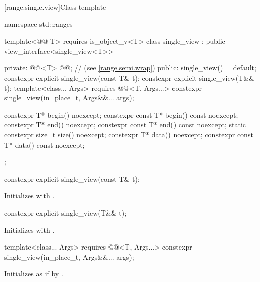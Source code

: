 [range.single.view]{Class template }

%
\begin{codeblock}
namespace std::ranges {
  template<@@ T>
    requires is_object_v<T>
  class single_view : public view_interface<single_view<T>> {
  private:
    @@<T> @@;      // \expos{} (see \ref{range.semi.wrap})
  public:
    single_view() = default;
    constexpr explicit single_view(const T& t);
    constexpr explicit single_view(T&& t);
    template<class... Args>
      requires @@<T, Args...>
    constexpr single_view(in_place_t, Args&&... args);

    constexpr T* begin() noexcept;
    constexpr const T* begin() const noexcept;
    constexpr T* end() noexcept;
    constexpr const T* end() const noexcept;
    static constexpr size_t size() noexcept;
    constexpr T* data() noexcept;
    constexpr const T* data() const noexcept;
  };
}
\end{codeblock}

%
\begin{itemdecl}
constexpr explicit single_view(const T& t);
\end{itemdecl}

\begin{itemdescr}
\pnum
\effects
Initializes  with .
\end{itemdescr}

%
\begin{itemdecl}
constexpr explicit single_view(T&& t);
\end{itemdecl}

\begin{itemdescr}
\pnum
\effects
Initializes  with .
\end{itemdescr}

%
\begin{itemdecl}
template<class... Args>
  requires @@<T, Args...>
constexpr single_view(in_place_t, Args&&... args);
\end{itemdecl}

\begin{itemdescr}
\pnum
\effects
Initializes  as if by
.
\end{itemdescr}

